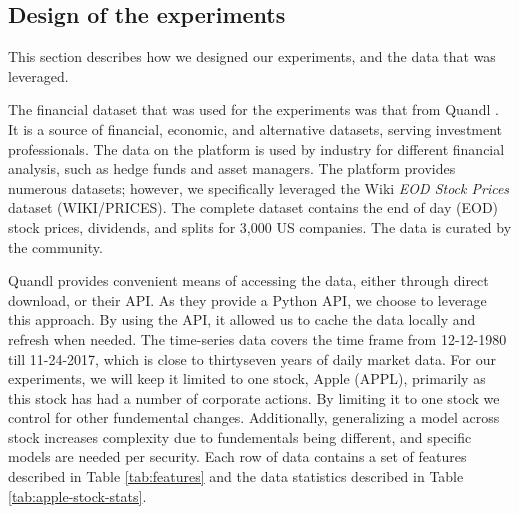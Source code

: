 \documentclass[11pt]{article}
\begin{document}

\subsection{Design of the experiments} \label{sec:design-experiments}

This section describes how we designed our experiments, and the data that was leveraged.

The financial dataset that was used for the experiments was that from Quandl \cite{QuandlFinancialQuandl}. It is a source of financial, economic, and alternative datasets, serving investment professionals. The data on the platform is used by industry for different financial analysis, such as hedge funds and asset managers. The platform provides numerous datasets; however, we specifically leveraged the Wiki \textit{EOD Stock Prices} dataset (WIKI/PRICES). The complete dataset contains the end of day (EOD) stock prices, dividends, and splits for 3,000 US companies. The data is curated by the community.

Quandl provides convenient means of accessing the data, either through direct download, or their API. As they provide a Python API, we choose to leverage this approach. By using the API, it allowed us to cache the data locally and refresh when needed. The time-series data covers the time frame from 12-12-1980 till 11-24-2017, which is close to thirtyseven years of daily market data. For our experiments, we will keep it limited to one stock, Apple (APPL), primarily as this stock has had a number of corporate actions. By limiting it to one stock we control for other fundemental changes. Additionally, generalizing a model across stock increases complexity due to fundementals being different, and specific models are needed per security. Each row of data contains a set of features described in Table \ref{tab:features} and the data statistics described in Table \ref{tab:apple-stock-stats}.
\end{document}
